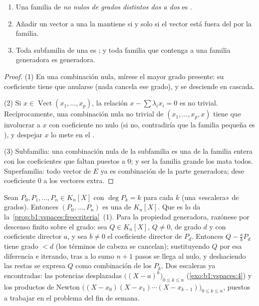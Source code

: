 \begin{proposition}\label{prop:b1:vspaces:freecriteria}
\begin{enumerate}
  \item Una familia de \emph{ no nulos de grados
        distintos dos a dos} es .
  \item Añadir un vector a una  la mantiene  si
        y solo si el vector está fuera del  por la
        familia.
  \item Toda subfamilia de una  es ; y toda
        familia que contenga a una familia generadora es generadora.
\end{enumerate}
\end{proposition}

\begin{proof}
(1) En una combinación nula, mírese el mayor grado presente: su
coeficiente tiene que anularse (nada cancela ese grado), y se
desciende en cascada.

(2) Si $x \in \operatorname{Vect}(x_1, \dots, x_p)$, la relación
$x - \sum\lambda_i x_i = 0$ es no trivial. Recíprocamente, una
combinación nula no trivial de $(x_1, \dots, x_p, x)$ tiene que
involucrar a $x$ con coeficiente no nulo (si no, contradiría que la
familia pequeña es ), y despejar $x$ lo mete en el
.

(3) Subfamilia: una combinación nula de la subfamilia es una de la
familia entera con los coeficientes que faltan puestos a $0$; y ser
 la familia grande los mata todos. Superfamilia: todo vector de
$E$ ya es combinación de la parte generadora; dese coeficiente $0$ a
los vectores extra.
\end{proof}

\begin{example}
\label{ex:b1:vspaces:staircase}
Sean $P_0, P_1, \dots, P_n \in K_n[X]$ con $\deg P_k = k$ para cada
$k$ (una «escalera» de grados). Entonces $(P_0, \dots, P_n)$ es una
 de $K_n[X]$. Que es  lo da
la~\cref{prop:b1:vspaces:freecriteria}~(1). Para la propiedad
generadora, razónese por descenso finito sobre el grado: sea
$Q \in K_n[X]$, $Q \neq 0$, de grado $d$ y con coeficiente director
$a$, y sea $b \neq 0$ el coeficiente director de $P_d$. Entonces
$Q - \frac ab P_d$ tiene grado $< d$ (los términos de cabeza se
cancelan); sustituyendo $Q$ por esa diferencia e iterando, tras a lo
sumo $n + 1$ pasos se llega al  nulo, y deshaciendo las
restas se expresa $Q$ como combinación de los $P_k$. Dos escaleras ya
encontradas: las potencias desplazadas
$\bigl((X-a)^k\bigr)_{0 \leq k \leq n}$ (\cref{exo:b1:vspaces:4}) y
los productos de Newton
$\bigl((X - x_0)(X - x_1)\cdots(X - x_{k-1})\bigr)_{0 \leq k \leq n}$,
puestos a trabajar en el problema del fin de semana.
\end{example}

